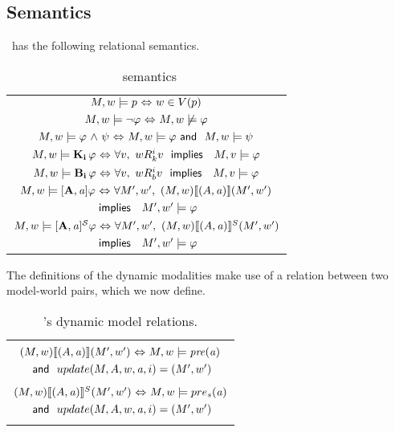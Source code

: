 \subsection{Semantics}
\DASL\ has the following relational semantics.

\begin{table}[H]
	\begin{center}
	\begin{tabular}{| c |}
		\hline	

	$M,w \models p  {\ \Leftrightarrow \ } w \in V(p)$ \\
	$M,w \models {\neg} \varphi  {\ \Leftrightarrow \ } M,w \not\models \varphi$ \\ 
	$M,w \models \varphi {\ \wedge \ } \psi {\ \Leftrightarrow \ } M,w \models \varphi \textsf{\ and \ } M,w \models \psi$ \\
	$M,w \models \mathbf{K}_{\mathbf{i}}\,\varphi {\ \Leftrightarrow \ } \forall v,\ wR_{k}^i v\ \textsf{\ implies \ }\ M,v \models \varphi$ \\
	$M,w \models \mathbf{B}_{\mathbf{i}}\,\varphi {\ \Leftrightarrow \ } \forall v,\ wR_{b}^i v\ \textsf{\ implies \ }\ M,v \models \varphi$ \\
	$M,w \models \mathbf{[A,\mathit{a}]}\varphi {\ \Leftrightarrow \ } \forall M',w',\  (M,w) \llbracket (A,\mathit{a}) \rrbracket (M',w')$ \\ $\timplies\ M',w' \models \varphi$ \\
	$M,w \models \mathbf{[A,\mathit{a}]^\mathcal{S}}\varphi {\ \Leftrightarrow \ } \forall M',w',\  (M,w) \llbracket (A,\mathit{a}) \rrbracket^S (M',w')$ \\ $\timplies\ M',w' \models \varphi$\\
	\hline 
	\end{tabular}
	\caption{\DASL\ semantics}
	\end{center}
\end{table}
The definitions of the dynamic modalities make use of a relation between two model-world pairs, which we now define.
\begin{table}[H]
	\begin{center}
		\begin{tabular}{|c|}
	\hline
	\\
	$(M,w)\llbracket (A,\mathit{a})\rrbracket (M',w') {\ \Leftrightarrow \ } M,w \models \mathit{pre}(\mathit{a})$ \\ $\textsf{\ and \ } update(M,A,w,\mathit{a},i) = (M',w')$ \\
	\\
	$(M,w)\llbracket (A,\mathit{a}) \rrbracket^S (M',w') {\ \Leftrightarrow \ } M,w \models pre_s(\mathit{a})$ \\ $\textsf{\ and \ } update(M,A,w,\mathit{a}, i) = (M',w')$\\
	\\
	\hline 
		\end{tabular}
	\caption{\DASL's dynamic model relations.}
	\end{center}
\end{table}




